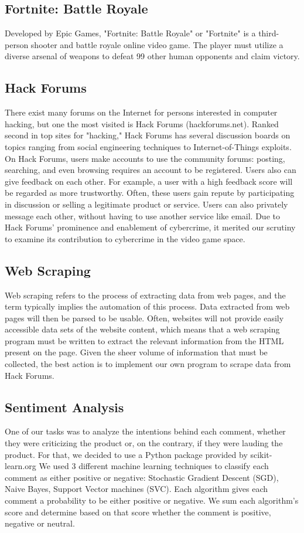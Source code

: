 \documentclass[sigconf]{acmart}
\begin{document}
\subsection{Fortnite: Battle Royale}
Developed by Epic Games, "Fortnite: Battle Royale" or "Fortnite" is a 
third-person shooter and battle royale online video game. The player must
utilize a diverse arsenal of weapons to defeat 99 other human opponents and 
claim victory. 

\subsection{Hack Forums}
There exist many forums on the Internet for persons interested in computer
hacking, but one the most visited is Hack Forums (hackforums.net). Ranked
second in top sites for "hacking," \cite{alexa} Hack Forums has several discussion boards
on topics ranging from social engineering techniques to Internet-of-Things 
exploits. On Hack Forums, users make accounts to use the community forums:
posting, searching, and even browsing requires an account to be registered.
Users also can give feedback on each other. For example, a user with
a high feedback score will be regarded as more trustworthy. Often, these users
gain repute by participating in discussion or selling a legitimate product or 
service. Users can also privately message each other, without having to use
another service like email. Due to Hack Forums' prominence and enablement of 
cybercrime, it merited our scrutiny to examine its contribution to cybercrime
in the video game space. 

\subsection{Web Scraping}
Web scraping refers to the process of extracting data from web pages, and the 
term typically implies the automation of this process. Data extracted from web
pages will then be parsed to be usable. Often, websites will not provide 
easily accessible data sets of the website content, which means that a 
web scraping program must be written to extract the relevant information from
the HTML present on the page. Given the sheer volume of information that must
be collected, the best action is to implement our own program to scrape data 
from Hack Forums.

\subsection{Sentiment Analysis}
One of our tasks was to analyze the intentions behind each comment, whether
they were criticizing the product or, on the contrary, if they were lauding
the product. For that, we decided to use a Python package provided by scikit-learn.org
We used 3 different machine learning techniques to classify each comment as
either positive or negative: Stochastic Gradient Descent (SGD), Naive Bayes, 
Support Vector machines (SVC). Each algorithm gives each comment a probability to be either positive or negative. We sum each algorithm's score and determine based on that score whether the comment is positive, negative or neutral.
\end{document}
